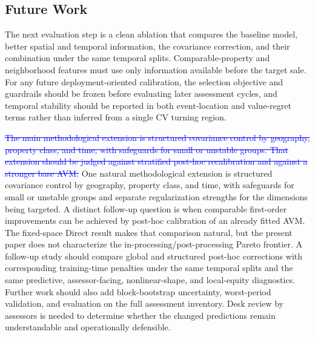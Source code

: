 \documentclass[10pt]{article}
\theoremstyle{definition}
\newcommand{\1}{\mathbf{1}}
\newcommand{\advisorchange}[1]{{\color{blue}#1}}
\newcommand{\oldtext}[1]{\textcolor{blue}{\sout{#1}}}
\newcommand{\newtext}[1]{\textcolor{impGreen}{#1}}
\newcommand{\latesttext}[1]{\textcolor{latestPurple}{#1}}
\begin{document}
\subsection{Future Work}

\advisorchange{The next evaluation step is a clean ablation} that compares the baseline model, better spatial and temporal information, the covariance correction, and their combination under the same temporal splits. Comparable-property and neighborhood features must use only information available before the target sale. 
\latesttext{For any future deployment-oriented calibration, the selection objective and guardrails should be frozen before evaluating later assessment cycles, and temporal stability should be reported in both event-location and value-regret terms rather than inferred from a single CV turning region.}


\oldtext{The main methodological extension is structured covariance control by geography, property class, and time, with safeguards for small or unstable groups. That extension should be judged against stratified post-hoc recalibration and against a stronger base AVM.}
\newtext{One natural methodological extension is structured covariance control by geography, property class, and time, with safeguards for small or unstable groups and separate regularization strengths for the dimensions being targeted. A distinct follow-up question is when comparable first-order improvements can be achieved by post-hoc calibration of an already fitted AVM. The fixed-space Direct result makes that comparison natural, but the present paper does not characterize the in-processing/post-processing Pareto frontier. A follow-up study should compare global and structured post-hoc corrections with corresponding training-time penalties under the same temporal splits and the same predictive, assessor-facing, nonlinear-shape, and local-equity diagnostics.} Further work should also add block-bootstrap uncertainty, worst-period validation, and evaluation on the full assessment inventory. Desk review by assessors is needed to determine whether the changed predictions remain understandable and operationally defensible.




\printbibliography
\end{document}
